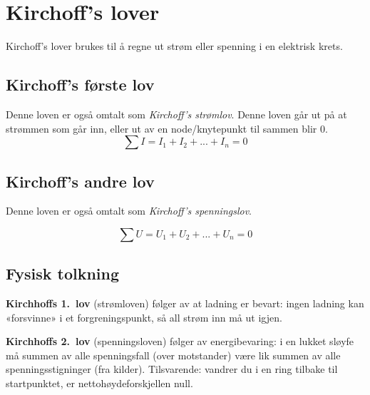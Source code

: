 \section{Kirchoff's lover}
Kirchoff's lover brukes til å regne ut strøm eller spenning i en elektrisk krets.

\subsection{Kirchoff's første lov}
Denne loven er også omtalt som \textit{Kirchoff's strømlov}. Denne loven går ut på at strømmen som går inn, eller ut av en node/knytepunkt til sammen blir 0.
\[\sum{I}=I_1+I_2+...+I_n=0\]

\subsection{Kirchoff's andre lov}
Denne loven er også omtalt som \textit{Kirchoff's spenningslov}.

\[\sum{U}=U_1+U_2+...+U_n=0\]



\subsection{Fysisk tolkning}

\textbf{Kirchhoffs 1.\ lov} (strømloven) følger av at ladning er bevart: ingen ladning kan «forsvinne» i et forgreningspunkt, så all strøm inn må ut igjen.

\textbf{Kirchhoffs 2.\ lov} (spenningsloven) følger av energibevaring: i en lukket sløyfe må summen av alle spenningsfall (over motstander) være lik summen av alle spenningsstigninger (fra kilder). Tilsvarende: vandrer du i en ring tilbake til startpunktet, er nettohøydeforskjellen null.

